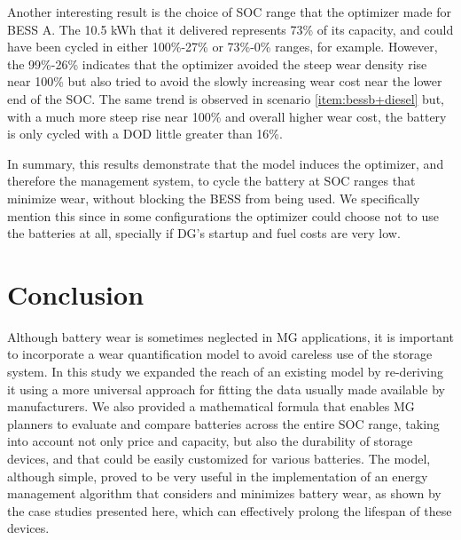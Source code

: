 \documentclass{ieeeaccess}
\begin{document}
    Another interesting result is the choice of \ac{SOC} range that the optimizer made for \ac{BESS} A. The 10.5 kWh that it delivered represents 73\% of its capacity, and could have been cycled in either 100\%-27\% or 73\%-0\% ranges, for example. However, the 99\%-26\% indicates that the optimizer avoided the steep wear density rise near 100\% but also tried to avoid the slowly increasing wear cost near the lower end of the \ac{SOC}. The same trend is observed in scenario \ref{item:bessb+diesel} but, with a much more steep rise near 100\% and overall higher wear cost, the battery is only cycled with a \ac{DOD} little greater than 16\%.

    In summary, this results demonstrate that the model induces the optimizer, and therefore the management system, to cycle the battery at \ac{SOC} ranges that minimize wear, without blocking the \ac{BESS} from being used. We specifically mention this since in some configurations the optimizer could choose not to use the batteries at all, specially if \ac{DG}'s startup and fuel costs are very low.

    \section{Conclusion}
    Although battery wear is sometimes neglected in \ac{MG} applications, it is important to incorporate a wear quantification model to avoid careless use of the storage system. In this study we expanded the reach of an existing model by re-deriving it using a more universal approach for fitting the data usually made available by manufacturers. We also provided a mathematical formula that enables \ac{MG} planners to evaluate and compare batteries across the entire \ac{SOC} range, taking into account not only price and capacity, but also the durability of storage devices, and that could be easily customized for various batteries. The model, although simple, proved to be very useful in the implementation of an energy management algorithm that considers and minimizes battery wear, as shown by the case studies presented here, which can effectively prolong the lifespan of these devices.

    
    

\EOD
\end{document}
